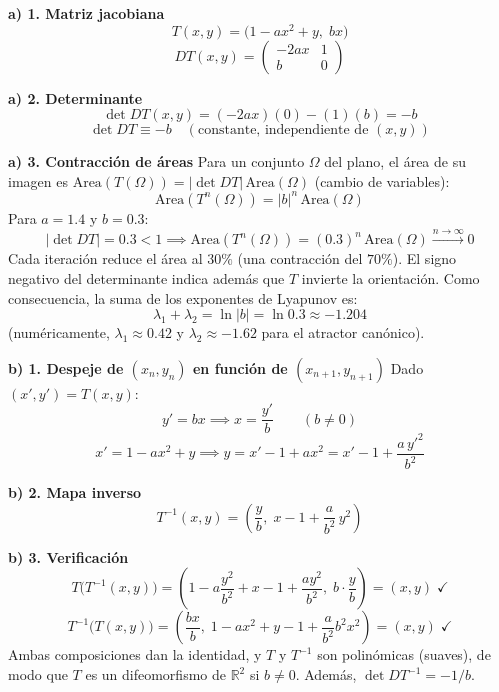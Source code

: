 \documentclass[11pt,a4paper]{article}
\newenvironment{solucion}[1][Solución Detallada]{%
    \vspace{1.5mm}%
    \noindent{\large\textbf{Solución:}}\par\vspace{1.5mm}%
}{%
    \par\vspace{3mm}%
}
\begin{document}
\begin{solucion}

\textbf{\large a) 1. Matriz jacobiana}
\[
T(x,y) = \bigl(1 - a x^2 + y,\; b x\bigr)
\]
\[
\boxed{DT(x,y) = \begin{pmatrix} -2 a x & 1 \\ b & 0 \end{pmatrix}}
\]

\vspace{3.5mm}

\textbf{\large a) 2. Determinante}
\[
\det DT(x,y) = (-2ax)(0) - (1)(b) = -b
\]
\[
\boxed{\det DT \equiv -b \quad (\text{constante, independiente de } (x,y))}
\]

\vspace{3.5mm}

\textbf{\large a) 3. Contracción de áreas}
Para un conjunto $\Omega$ del plano, el área de su imagen es $\mathrm{Area}(T(\Omega)) = |\det DT|\,\mathrm{Area}(\Omega)$ (cambio de variables):
\[
\mathrm{Area}(T^n(\Omega)) = |b|^n\,\mathrm{Area}(\Omega)
\]
Para $a = 1.4$ y $b = 0.3$:
\[
|\det DT| = 0.3 < 1 \implies \boxed{\mathrm{Area}(T^n(\Omega)) = (0.3)^n\,\mathrm{Area}(\Omega) \xrightarrow{n\to\infty} 0}
\]
Cada iteración reduce el área al $30\%$ (una contracción del $70\%$). El signo negativo del determinante indica además que $T$ invierte la orientación. Como consecuencia, la suma de los exponentes de Lyapunov es:
\[
\lambda_1 + \lambda_2 = \ln|b| = \ln 0.3 \approx -1.204
\]
(numéricamente, $\lambda_1 \approx 0.42$ y $\lambda_2 \approx -1.62$ para el atractor canónico).

\vspace{3.5mm}

\textbf{\large b) 1. Despeje de $(x_n, y_n)$ en función de $(x_{n+1}, y_{n+1})$}
Dado $(x', y') = T(x, y)$:
\[
y' = b x \implies x = \frac{y'}{b} \qquad (b \ne 0)
\]
\[
x' = 1 - a x^2 + y \implies y = x' - 1 + a x^2 = x' - 1 + \frac{a\,y'^2}{b^2}
\]

\vspace{3.5mm}

\textbf{\large b) 2. Mapa inverso}
\[
\boxed{T^{-1}(x, y) = \left(\frac{y}{b},\; x - 1 + \frac{a}{b^2}\,y^2\right)}
\]

\vspace{3.5mm}

\textbf{\large b) 3. Verificación}
\[
T\bigl(T^{-1}(x,y)\bigr) = \left(1 - a\frac{y^2}{b^2} + x - 1 + \frac{a y^2}{b^2},\; b\cdot\frac{y}{b}\right) = (x, y) \;\checkmark
\]
\[
T^{-1}\bigl(T(x,y)\bigr) = \left(\frac{bx}{b},\; 1 - a x^2 + y - 1 + \frac{a}{b^2}b^2 x^2\right) = (x, y) \;\checkmark
\]
Ambas composiciones dan la identidad, y $T$ y $T^{-1}$ son polinómicas (suaves), de modo que $T$ es un difeomorfismo de $\mathbb{R}^2$ si $b \ne 0$. Además, $\det DT^{-1} = -1/b$.


\end{solucion}
\end{document}
